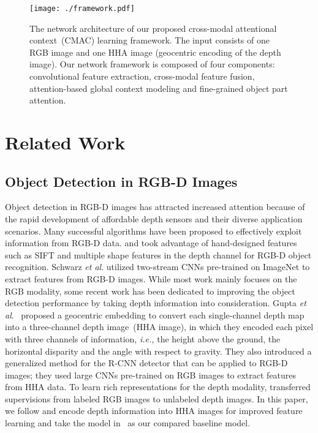 \documentclass[journal]{IEEEtran}
\begin{document}
\begin{figure*}
  \centering
  \texttt{[image: ./framework.pdf]}
  \caption{\label{fig:framework} The network architecture of our proposed cross-modal attentional context~(CMAC) learning framework. The input consists of one RGB image and one HHA image (geocentric encoding of the depth image). Our network framework is composed of four components: convolutional feature extraction, cross-modal feature fusion, attention-based global context modeling and fine-grained object part attention.}
\end{figure*}

\section{Related Work}
\subsection{Object Detection in RGB-D Images}
Object detection in RGB-D images has attracted increased attention because of the rapid development of affordable depth sensors and their diverse application scenarios. Many successful algorithms have been proposed to effectively exploit information from RGB-D data. \cite{bo2011depth} and \cite{lai2011large} took advantage of hand-designed features such as SIFT and multiple shape features in the depth channel for RGB-D object recognition. Schwarz \textit{et al}. \cite{schwarz2015rgb} utilized two-stream CNNs pre-trained on ImageNet to extract features from RGB-D images. While most work mainly focuses on the RGB modality, some recent work has been dedicated to improving the object detection performance by taking depth information into consideration. Gupta \textit{et al}.~\cite{gupta2014learning} proposed a geocentric embedding to convert each single-channel depth map into a three-channel depth image~(HHA image), in which they encoded each pixel with three channels of information, \textit{i.e.,} the height above the ground, the horizontal disparity and the angle with respect to gravity. They also introduced a generalized method for the R-CNN detector that can be applied to RGB-D images; they used large CNNs pre-trained on RGB images to extract features from HHA data. To learn rich representations for the depth modality, \cite{gupta2016cross} transferred supervisions from labeled RGB images to unlabeled depth images. In this paper, we follow \cite{gupta2014learning} and encode depth information into HHA images for improved feature learning and take the model in~\cite{gupta2016cross} as our compared baseline model.
\end{document}
